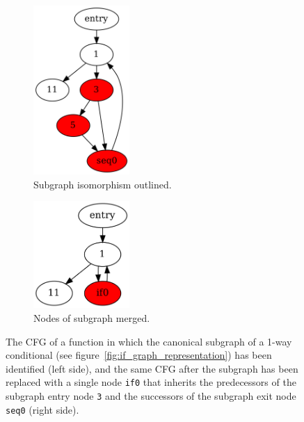 \begin{figure}[htbp]
	\centering
	\begin{subfigure}[b]{0.40\textwidth}
		\centering
		\includegraphics[width=0.4\textwidth]{inc/3_background/hammock_method/cfg_pre_merge.png}
		\caption{Subgraph isomorphism outlined.}
		\label{fig:subgraph_located}
	\end{subfigure}
	\begin{subfigure}[b]{0.40\textwidth}
		\centering
		\includegraphics[width=0.4\textwidth]{inc/3_background/hammock_method/cfg_post_merge.png}
		\caption{Nodes of subgraph merged.}
	\end{subfigure}
	\caption{The CFG of a function in which the canonical subgraph of a 1-way conditional (see figure~\ref{fig:if_graph_representation}) has been identified (left side), and the same CFG after the subgraph has been replaced with a single node \texttt{if0} that inherits the predecessors of the subgraph entry node \texttt{3} and the successors of the subgraph exit node \texttt{seq0} (right side).}
	\label{fig:subgraph_merge}
\end{figure}

